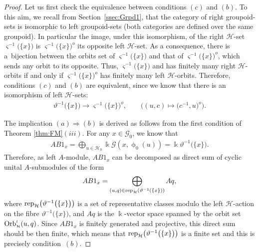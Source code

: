 \documentclass[10pt,a4paper]{amsart}
\numberwithin{equation}{section}
\newcommand{\Go}{\cG_{\Sscript{0}}}
\newcommand{\Ho}{\cH_{\Sscript{0}}}
\newcommand{\cG}{{\mathcal G}}
\newcommand{\cH}{{\mathcal H}}
\newcommand{\Sscript}[1]{\scriptscriptstyle{#1}}
\newcommand{\phio}{\upphi_{\Sscript{0}}}
\begin{document}
\begin{proof}Let us first check the equivalence between conditions $(c)$ and $(b)$. To this aim, we recall from Section~\ref{ssec:Grpd1}, that the category of right groupoid-sets is isomorphic to left groupoid-sets (both categories are defined over the same groupoid). In particular the image, under this isomorphism, of the right $\cH$-set $\varsigma^{-1}\big( \{x\} \big)$ is $\varsigma^{-1}\big( \{x\} \big)^{\Sscript{o}}$ its opposite left $\cH$-set. As a consequence, there is a~bijection between the orbits set of $\varsigma^{-1}\big( \{x\} \big)$ and that of $\varsigma^{-1}\big( \{x\} \big)^{\Sscript{o}}$, which sends any orbit to its opposite.
Thus, $\varsigma^{-1}\big( \{x\} \big)$ and has finitely many right $\cH$-orbits if and only if $\varsigma^{-1}\big( \{x\} \big)^{\Sscript{o}}$ has finitely many left $\cH$-orbits. Therefore, conditions $(c)$ and $(b)$ are equivalent, since we know that there is an isomorphism of left $\cH$-sets:
\begin{gather}\label{Eq:TS}
\vartheta^{-1}\big( \{x\} \big) \longrightarrow \varsigma^{-1}\big( \{x\} \big)^{\Sscript{o}}, \qquad \big( (u,c) \longmapsto \big(c^{-1},u\big)^{\Sscript{o}} \big).
\end{gather}

The implication $(a) \Rightarrow (b)$ is derived as follows from the first condition of Theorem \ref{thm:FM}$(iii)$. For any $x \in \Go$, we know that
\begin{gather*}
AB1_{x}=\bigoplus_{u \in \Ho} \Bbbk \cG(x, \phio(u))= \Bbbk \vartheta^{-1}\big( \{x\}\big).
\end{gather*}
Therefore, as left $A$-module, $AB1_{x}$ can be decomposed as direct sum of cyclic unital $A$-sub\-mo\-du\-les of the form
\begin{gather*}
AB1_{x} = \bigoplus_{(u, q) \in {\rm rep}_{\cH}(\vartheta^{-1}( \{x\}))} A q,
\end{gather*}
where ${\rm rep}_{\cH}\big(\vartheta^{-1}\big( \{x\}\big)\big)$ is a set of representative classes modulo the left $\cH$-action on the fibre $\vartheta^{-1}\big( \{x\}\big)$, and $A q$ is the $\Bbbk$-vector space spanned by the orbit set ${\rm Orb}_{\Sscript{\cH}}^{\Sscript{l}}(u,q)$. Since $AB1_{x}$ is finitely generated and projective, this direct sum should be then finite, which means that ${\rm rep}_{\cH}\big(\vartheta^{-1}\big(
\{x\}\big)\big)$ is a finite set and this is precisely condition~$(b)$.


\end{proof}
\end{document}
